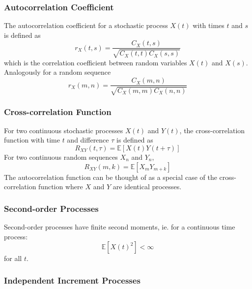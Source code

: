 \documentclass[11pt]{report} %
\begin{document}
\subsubsection{Autocorrelation Coefficient}

The autocorrelation coefficient for a stochastic process $X\left(t\right)$ with times $t$ and $s$ is defined as
\begin{equation}
r_{X}\left(t, s\right) = \dfrac{C_{X}\left(t, s\right)}{\sqrt{C_{X}\left(t, t\right)C_{X}\left(s, s\right)}}
\end{equation}
which is the correlation coefficient between random variables $X\left(t\right)$ and $X\left(s\right)$. Analogously for a random sequence
\begin{equation}
r_{X}\left(m, n\right) = \dfrac{C_{X}\left(m, n\right)}{\sqrt{C_{X}\left(m, m\right)C_{X}\left(n, n\right)}}
\end{equation}

\subsubsection{Cross-correlation Function}

For two continuous stochastic processes $X\left(t\right)$ and $Y\left(t\right)$, the cross-correlation function with time $t$ and difference $\tau$ is defined as
\begin{equation}
R_{XY}\left(t, \tau\right) = \mathbb{E}\left[X\left(t\right)Y\left(t + \tau\right)\right]
\end{equation}
For two continuous random sequences $X_{n}$ and $Y_{n}$,
\begin{equation}
R_{XY}\left(m, k\right) = \mathbb{E}\left[X_{m}Y_{m + k}\right]
\end{equation}
The autocorrelation function can be thought of as a special case of the cross-correlation function where $X$ and $Y$ are identical processes.

\subsubsection{Second-order Processes}

Second-order processes have finite second moments, ie. for a continuous time process:
\begin{equation}
\mathbb{E}\left[X\left(t\right)^{2}\right] < \infty
\end{equation}
for all $t$.

\subsubsection{Independent Increment Processes}
\end{document}

